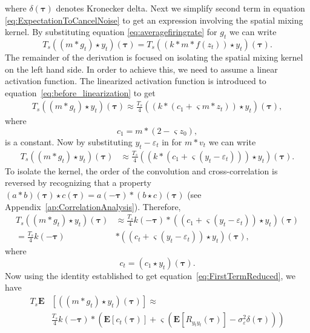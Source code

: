\documentclass[10pt,twocolumn,twoside]{IEEEtran}
\begin{document}
where $\delta(\boldsymbol\tau)$ denotes Kronecker delta. Next we simplify second term in equation \eqref{eq:ExpectationToCancelNoise} to get an expression involving the spatial mixing kernel. By substituting equation \eqref{eq:averagefiringrate} for $g_t$ we can write
\begin{equation}\label{eq:before_linearization}
	T_s((m \ast g_t) \star y_t)(\boldsymbol\tau) = T_s((k \ast m\ast f(z_t)) \star y_t)(\boldsymbol\tau).
\end{equation}   
The remainder of the derivation is focused on isolating the spatial mixing kernel on the left hand side. In order to achieve this, we need to assume a linear activation function. The linearized activation function is introduced to equation~\eqref{eq:before_linearization} to get
\begin{align}	
	T_s((m \ast g_t) \star y_t)(\boldsymbol\tau) \approx \frac{T_s}{4}((k\ast (c_1 + \varsigma m \ast z_t)) \star y_t)(\boldsymbol\tau), 
\end{align}
where
\begin{equation}
	c_1 = m\ast (2 - \varsigma z_0),
\end{equation}
is a constant. Now by substituting $y_t - \varepsilon_t$ in for $m\ast v_t$ we can write
\begin{align}
	T_s((m \ast g_t) \star y_t)(\boldsymbol\tau) &\approx \frac{T_s}{4}((k\ast (c_1 + \varsigma (y_t - \varepsilon_t))) \star y_t) (\boldsymbol\tau).
\end{align}
To isolate the kernel, the order of the convolution and cross-correlation is reversed by recognizing that a property $(a \ast b)(\boldsymbol\tau) \star c(\boldsymbol\tau) = a(-\boldsymbol\tau)\ast(b \star c)(\boldsymbol\tau)$ (see Appendix~\ref{ap:CorrelationAnalysis}). Therefore,
\begin{align}
	T_s((m \ast g_t) \star y_t)(\boldsymbol\tau) &\approx \frac{T_s}{4} k(-\boldsymbol\tau) \ast ((c_1 + \varsigma (y_t - \varepsilon_t)) \star y_t)(\boldsymbol\tau) \nonumber\\
	= \frac{T_s}{4}k(-\boldsymbol\tau) & \ast (( c_t + \varsigma (y_t - \varepsilon_t)) \star y_t) (\boldsymbol\tau),
\end{align}
where
\begin{equation}
	c_t = (c_1\star y_t)(\boldsymbol\tau).
\end{equation}  
Now using the identity established to get equation~\eqref{eq:FirstTermReduced}, we have
\begin{align}\label{eq:second_term_reduced}
	T_s\mathbf{E}&\left[((m \ast g_t) \star y_t)(\boldsymbol\tau)\right] \approx \nonumber \\
	&\frac{T_s}{4} k(-\boldsymbol\tau) \ast (\mathbf{E}\left[c_t(\boldsymbol\tau)\right] + \varsigma (\mathbf{E}\left[R_{y_ty_t}(\boldsymbol\tau)\right] - \sigma_{\varepsilon}^2 \delta(\boldsymbol\tau)))
\end{align}
\end{document}
